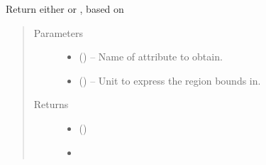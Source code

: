 \documentclass[letterpaper,10pt,english]{sphinxmanual}
\begin{document}
\begin{fulllineitems}
\begin{fulllineitems}
\label{\detokenize{references/freqfilter:nmrespy.freqfilter.FrequencyFilter._get_region}}
\sphinxAtStartPar
Return either  or , based on 
\begin{quote}\begin{description}
\item[{Parameters}] \leavevmode\begin{itemize}
\item {} 
\sphinxAtStartPar
{} () – Name of attribute to obtain.

\item {} 
\sphinxAtStartPar
{} (\sphinxstyleliteralemphasis{\sphinxupquote{, }}\sphinxstyleliteralemphasis{\sphinxupquote{, }}) – Unit to express the region bounds in.

\end{itemize}

\item[{Returns}] \leavevmode
\sphinxAtStartPar
\begin{itemize}
\item {} 
\sphinxAtStartPar
{} ()

\item {} 
\sphinxAtStartPar
{}

\end{itemize}


\end{description}\end{quote}

\end{fulllineitems}



\end{fulllineitems}
\end{document}
